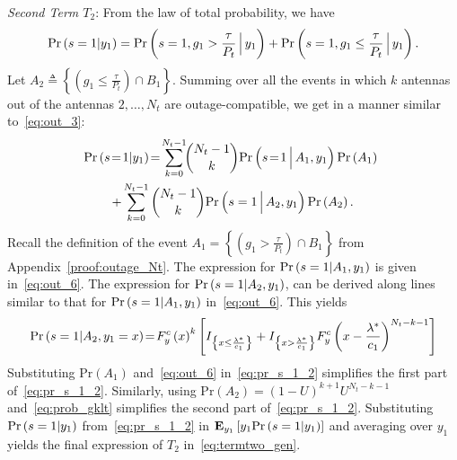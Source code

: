 \documentclass[12pt,draftcls,peerreview,onecolumn]{IEEEtran}
\newcommand{\brac}[1]{\left({#1}\right)}
\newcommand{\cbrac}[1]{\left\{{#1}\right\}}
\newcommand{\indic}[1]{I_{\cbrac{#1}}}
\newcommand{\define}{\triangleq}
\newcommand{\explow}[2]{{\bf{E}}_{#1}\left[{#2}\right]}
\newcommand{\prob}[1]{\text{Pr}\brac{#1}}
\newcommand{\given}{\arrowvert}
\newcommand{\Given}{\Big\arrowvert}
\newcommand{\nck}[2]{\binom{#1}{#2}}
\newcommand{\setB}{B_1}
\newcommand{\setAgt}{A_1}
\newcommand{\setAlt}{A_2}
\newcommand{\lam}{\lambda}
\newcommand{\lamstar}{\lam^{*}}
\newcommand{\termtwo}{T_2}
\newcommand{\Nt}{{N_t}}
\newcommand{\Pt}{{P_t}}
\newcommand{\puch}{g}
\newcommand{\gk}[1]{{\puch_{#1}}}
\newcommand{\itau}{\tau}
\newcommand{\cone}{c_{1}}
\newcommand{\m}{\cone}
\newcommand{\taubypt}{\frac{\itau}{\Pt}}
\newcommand{\gkgrtaubypt}[1]{{\gk{#1}}>\taubypt}
\newcommand{\gklttaubypt}[1]{{\gk{#1}}\leq\taubypt}
\newcommand{\lamstarbym}{\frac{\lamstar}{\m}}
\newcommand{\yk}[1]{y_{#1}}
\newcommand{\un}{U}
\begin{document}
{\em Second Term $\termtwo$}: From the law of total probability, we have 
%
\begin{equation}
\prob{s = 1\given \yk{1}} = \prob{s = 1,\gk{1}>\taubypt\Given\yk{1}}  + \prob{s = 1,\gk{1}\leq\taubypt\Given \yk{1}}. 
\label{eq:pr_s_1}
\end{equation}
%
Let  $\setAlt\define\left\{\left(\gklttaubypt{1}\right)\cap\setB \right\}$. Summing over all the events in which $k$ antennas out of the antennas $2,\ldots,\Nt$ are outage-compatible, we get in a manner similar to~\eqref{eq:out_3}:
\begin{multline}
\!\!\prob{s \!=\! 1\given \yk{1}}\! =\!\sum_{k=0}^{\Nt-1}\!\!\nck{\Nt-1}{k} 
\prob{s \!=\! 1 \Given \setAgt , \yk{1}} \prob{\setAgt}\\ + \sum_{k=0}^{\Nt-1}\nck{\Nt-1}{k}\prob{s = 1 \Given \setAlt, \yk{1}} \prob{\setAlt}. 
\label{eq:pr_s_1_2}
\end{multline}
% 
%
Recall  the definition of the event  $\setAgt=\left\{\left(\gkgrtaubypt{1}\right)\cap\setB \right\}$ from Appendix~\ref{proof:outage_Nt}. The expression for $\prob{s = 1\given \setAgt, \yk{1}}$ is given in~\eqref{eq:out_6}.  The expression for $\prob{s = 1\given \setAlt, \yk{1}}$, can be derived along lines similar to that for $\prob{s = 1\given \setAgt, \yk{1}}$ in~\eqref{eq:out_6}. This yields   
\begin{equation}
\text{Pr}\brac{s =1\given \setAlt,\yk{1}=x} \!=\! F_{y}^{c}\brac{x}^{k}\left[\indic{x\leq\lamstarbym} +\indic{x>\lamstarbym}F_{y}^{c}\brac{x-\lamstarbym}^{\Nt-k-1}\right]
\label{eq:prob_gklt}
\end{equation}
%
Substituting $\prob{\setAgt}$ and~\eqref{eq:out_6} in~\eqref{eq:pr_s_1_2} simplifies the first part of~\eqref{eq:pr_s_1_2}. Similarly, using $\prob{\setAlt}=\left(1-\un\right)^{k+1}\un^{\Nt-k-1}$ and~\eqref{eq:prob_gklt} simplifies the second part of~\eqref{eq:pr_s_1_2}. Substituting $\prob{s = 1\given \yk{1}}$ from~\eqref{eq:pr_s_1_2} in $\explow{\yk{1}}{ \yk{1}\prob{s = 1\given \yk{1}}}$ and averaging over $\yk{1}$ yields the final expression of $\termtwo$ in~\eqref{eq:termtwo_gen}. 
\end{document}
